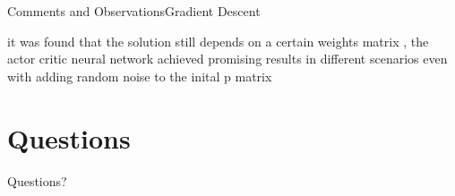 \documentclass{beamer}
\begin{document}
\begin{frame}{Comments and Observations}{Gradient Descent}
\begin{block}{}
it was found that the solution still depends on a certain weights matrix , the actor critic neural network achieved promising results in different scenarios even with adding random noise to the inital p matrix
\\

\end{block}
\end{frame}

\section*{Questions}
\begin{frame}
\begin{LARGE}
\begin{center}
Questions?
\end{center}
\end{LARGE}
\end{frame}
\end{document}
